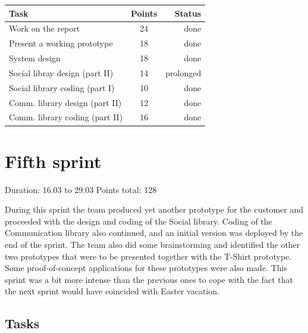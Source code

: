 \begin{table}[ht!]
\begin{tabular}{ | l | c | r | }

\hline
\textbf{Task} & \textbf{Points} & \textbf{Status} \\
\hline

Work on the report				& 24 & done \\
\hline
Present a working prototype		& 18 & done \\
\hline
System design					& 18 & done \\
\hline
Social libray design (part II)	& 14 & prolonged \\
\hline
Social library coding (part I)	& 10 & done \\
\hline
Comm. library design (part II)	& 12 & done \\
\hline
Comm. library coding (part II)	& 16 & done \\
\hline

\end{tabular}
\end{table}

\newpage

\section{Fifth sprint}

Duration: 16.03 to 29.03
Points total: 128

During this sprint the team produced yet another prototype for the customer
and proceeded with the design and coding of the Social library.
Coding of the Communication library also continued, and an initial version
was deployed by the end of the sprint. The team also did some brainstorming
and identified the other two prototypes that were to be presented together with
the T-Shirt prototype. Some proof-of-concept applications for these
prototypes were also made. This sprint was a bit more intense than the previous
ones to cope with the fact that the next sprint would have coincided with Easter vacation.

\subsection{Tasks}


